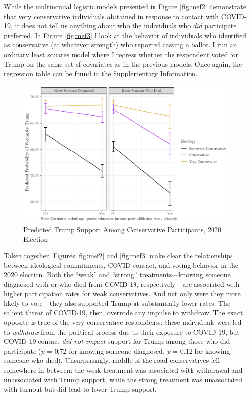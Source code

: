 \documentclass[
  12pt,
]{article}
\begin{document}
While the multinomial logistic models presented in Figure \ref{fig:mef2} demonstrate that very conservative individuals abstained in response to contact with COVID-19, it does not tell us anything about who the individuals who \emph{did} participate preferred. In Figure \ref{fig:mef3} I look at the behavior of individuals who identified as conservative (at whatever strength) who reported casting a ballot. I run an ordinary least squares model where I regress whether the respondent voted for Trump on the same set of covariates as in the previous models. Once again, the regression table can be found in the Supplementary Information.

\begin{figure}[!htbp]

{\centering \includegraphics{theory_paper_files/figure-latex/mef3-c-1} 

}

\caption{\label{fig:mef3}Predicted Trump Support Among Conservative Participants, 2020 Election}\label{fig:mef3-c}
\end{figure}

Taken together, Figures \ref{fig:mef2} and \ref{fig:mef3} make clear the relationships between ideological commitments, COVID contact, and voting behavior in the 2020 election. Both the ``weak'' and ``strong'' treatments---knowing someone diagnosed with or who died from COVID-19, respectively---are associated with higher participation rates for weak conservatives. And not only were they more likely to vote---they also supported Trump at substantially lower rates. The salient threat of COVID-19, then, overrode any impulse to withdraw. The exact opposite is true of the very conservative respondents: these individuals were led to \emph{withdraw} from the political process due to their exposure to COVID-19, but COVID-19 contact \emph{did not impact} support for Trump among those who did participate (\emph{p} = 0.72 for knowing someone diagnosed, \emph{p} = 0.12 for knowing someone who died). Unsurprisingly, middle-of-the-road conservatives fell somewhere in between: the weak treatment was associated with withdrawal and unassociated with Trump support, while the strong treatment was unassociated with turnout but did lead to lower Trump support.
\end{document}

